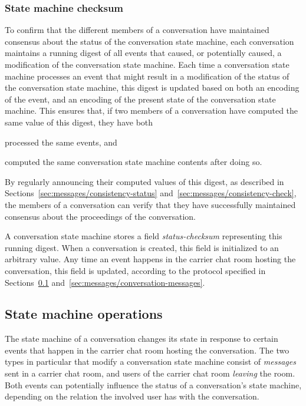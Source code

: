 \documentclass{article}
\def\smfield#1{\textsl{#1}}
\begin{document}


\subsubsection{State machine checksum}
\label{sec:conversation-state-machine/contents/checksum}

To confirm that the different members of a conversation have maintained consensus about the status of the conversation state machine, each conversation maintains a running digest of all events that caused, or potentially caused, a modification of the conversation state machine.
Each time a conversation state machine processes an event that might result in a modification of the status of the conversation state machine, this digest is updated based on both an encoding of the event, and an encoding of the present state of the conversation state machine.
This ensures that, if two members of a conversation have computed the same value of this digest, they have both
\begin{enumerate*}[label={(\alph*)}]
\item processed the same events, and
\item computed the same conversation state machine contents after doing so.
\end{enumerate*}
By regularly announcing their computed values of this digest, as described in Sections~\ref{sec:messages/consistency-status} and~\ref{sec:messages/consistency-check}, the members of a conversation can verify that they have successfully maintained consensus about the proceedings of the conversation.


A conversation state machine stores a field \smfield{status-checksum} representing this running digest.
When a conversation is created, this field is initialized to an arbitrary value.
Any time an event happens in the carrier chat room hosting the conversation, this field is updated, according to the protocol specified in Sections~\ref{sec:conversation-state-machine/operations} and~\ref{sec:messages/conversation-messages}.


\subsection{State machine operations}
\label{sec:conversation-state-machine/operations}

The state machine of a conversation changes its state in response to certain events that happen in the carrier chat room hosting the conversation.
The two types in particular that modify a conversation state machine consist of \emph{messages} sent in a carrier chat room, and users of the carrier chat room \emph{leaving} the room.
Both events can potentially influence the status of a conversation's state machine, depending on the relation the involved user has with the conversation.
\end{document}
